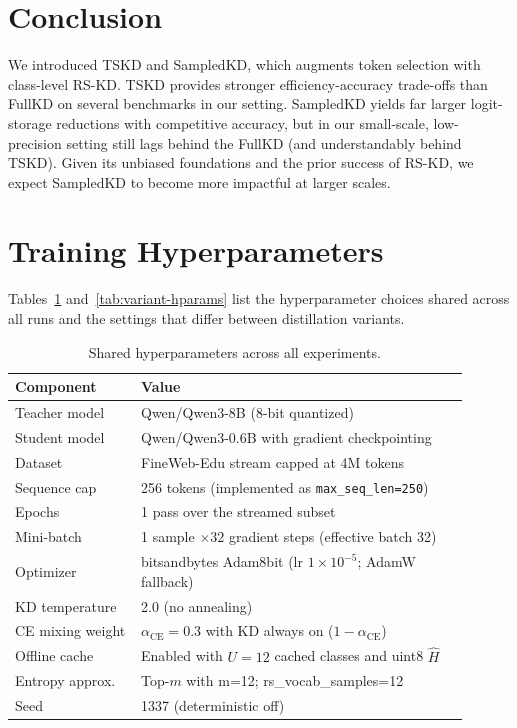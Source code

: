 \documentclass[11pt]{article}
\begin{document}
\section{Conclusion}
\label{sec:conclusion}
We introduced TSKD and SampledKD, which augments token selection with class-level RS-KD.
TSKD provides stronger efficiency-accuracy trade-offs than FullKD on several benchmarks in our setting.
SampledKD yields far larger logit-storage reductions with competitive accuracy, but in our small-scale, low-precision setting still lags behind the FullKD (and understandably behind TSKD).
Given its unbiased foundations and the prior success of RS-KD, we expect SampledKD to become more impactful at larger scales.




\appendix
\section{Training Hyperparameters}
\label{app:hyperparams}

Tables~\ref{tab:shared-hparams} and~\ref{tab:variant-hparams} list the hyperparameter choices shared across all runs and the settings that differ between distillation variants.

\begin{table}[h]
	\centering
	\small
	\setlength{\tabcolsep}{8pt}
\begin{tabular}{p{0.25\linewidth}p{0.65\linewidth}}
Component & Value \\
\midrule
Teacher model & Qwen/Qwen3-8B (8-bit quantized) \\
Student model & Qwen/Qwen3-0.6B with gradient checkpointing \\
Dataset & FineWeb-Edu stream capped at 4M tokens \\
Sequence cap & 256 tokens (implemented as \texttt{max\_seq\_len=250}) \\
Epochs & 1 pass over the streamed subset \\
Mini-batch & 1 sample \(\times 32\) gradient steps (effective batch 32) \\
Optimizer & bitsandbytes Adam8bit (lr $1\times 10^{-5}$; AdamW fallback) \\
KD temperature & 2.0 (no annealing) \\
CE mixing weight & $\alpha_{\text{CE}}=0.3$ with KD always on ($1-\alpha_{\text{CE}}$) \\
Offline cache & Enabled with $U=12$ cached classes and uint8 $\hat H$ \\
Entropy approx. & Top-$m$ with m=12; rs\_vocab\_samples=12 \\
Seed & 1337 (deterministic off) \\
\bottomrule
\end{tabular}
\caption{Shared hyperparameters across all experiments.}
\label{tab:shared-hparams}
\end{table}
\end{document}
